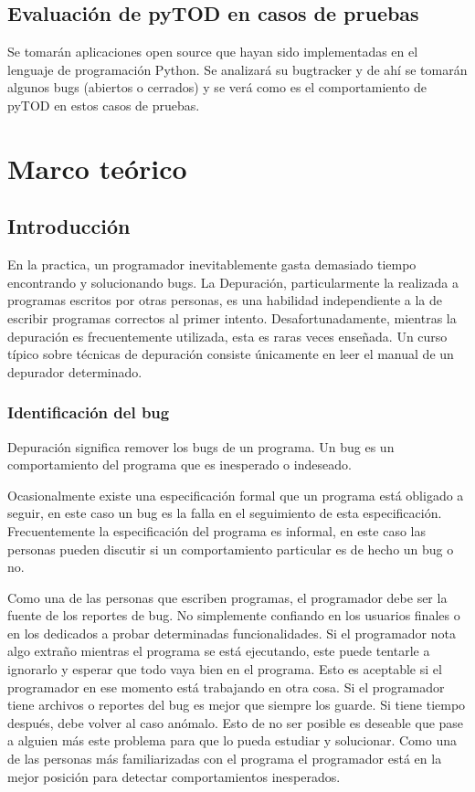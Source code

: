 \documentclass[12pt,a4paper]{report}
\begin{document}
	\section{Evaluación de pyTOD en casos de pruebas}

 Se tomarán aplicaciones open source que hayan sido implementadas en el lenguaje de programación Python.  Se analizará su bugtracker y de ahí se tomarán algunos bugs (abiertos o cerrados) y se verá como es el comportamiento de pyTOD en estos casos de pruebas.


\chapter{Marco teórico}
	\section{Introducción}

En la practica, un programador inevitablemente gasta demasiado tiempo encontrando y solucionando bugs. La Depuración, particularmente la realizada a programas escritos por otras personas, es una habilidad independiente a la de escribir programas correctos al primer intento. Desafortunadamente, mientras la depuración es frecuentemente utilizada, esta es raras veces enseñada. Un curso típico sobre técnicas de depuración consiste únicamente en leer el manual de un depurador determinado.

\subsection{Identificación del bug}

Depuración significa remover los bugs de un programa.  Un bug es un comportamiento del programa que es inesperado o indeseado.

Ocasionalmente existe una especificación formal que un programa está obligado a seguir, en este caso un bug es la falla en el seguimiento de esta especificación.  Frecuentemente la especificación del programa es informal, en este caso las personas pueden discutir si un comportamiento particular es de hecho un bug o no.

Como una de las personas que escriben programas, el programador debe ser la fuente de los reportes de bug.  No simplemente confiando en los usuarios finales o en los dedicados a probar determinadas funcionalidades.  Si el programador nota algo extraño mientras el programa se está ejecutando, este puede tentarle a ignorarlo y esperar que todo vaya bien en el programa.  Esto es aceptable si el programador en ese momento está trabajando en otra cosa.  Si el programador tiene archivos o reportes del bug es mejor que siempre los guarde.  Si tiene tiempo después, debe volver al caso anómalo.  Esto de no ser posible es deseable que pase a alguien más este problema para que lo pueda estudiar y solucionar.  Como una de las personas más familiarizadas con el programa el programador está en la mejor posición para detectar comportamientos inesperados.
\end{document}
